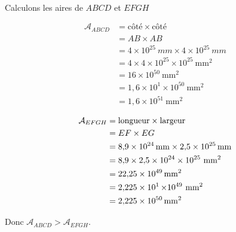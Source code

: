 \documentclass[../Cours.tex]{subfiles}
\begin{document}
\begin{questions}
    \exercice\\
        \question Calculons les aires de $ABCD$ et $EFGH$\\
        \noindent\begin{minipage}{0.5\linewidth}
        \begin{align*}
            \mathcal{A}_{ABCD} &= \mbox{côté} \times \mbox{côté} \\
            &= AB \times AB \\
            &= 4 \times 10^{25}~\unit{mm} \times 4 \times 10^{25}~\unit{mm} \\
            &= 4 \times 4 \times 10^{25} \times 10^{25}~\unit{\milli\metre\squared} \\
            &= 16 \times 10^{50}~\unit{\milli\metre\squared} \\
            &= 1,6 \times 10^1 \times 10^{50}~\unit{\milli\metre\squared} \\
            &= 1,6 \times 10^{51}~\unit{\milli\metre\squared}
        \end{align*}\end{minipage}
        \begin{minipage}{0.5\linewidth}
        \begin{align*}
            \mathcal{A}_{EFGH} &= \mbox{longueur} \times \mbox{largeur} \\
            &= EF \times EG \\
            &= \qty{8.9e24}{mm} \times \qty{2.5e25}{mm} \\
            &= \num{8.9} \times \num{2.5} \times 10^{24} \times 10^{25} ~\unit{mm\squared} \\
            &= \qty{22.25e49}{mm\squared} \\
            &= \qty{2.225e1} \times 10^{49} ~\unit{mm\squared} \\
            &= \qty{2.225e50}{mm\squared}
        \end{align*}
        \end{minipage}

        \centerline{Donc $\mathcal{A}_{ABCD} > \mathcal{A}_{EFGH}$.}


\end{questions}
\end{document}
